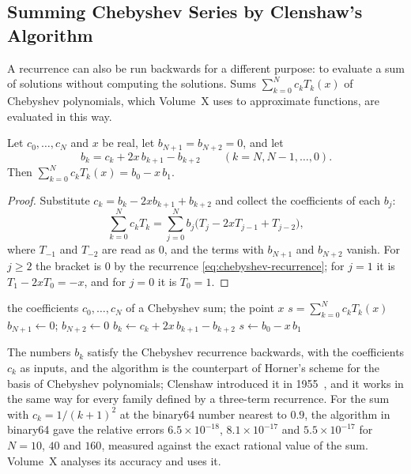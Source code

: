 \subsection{Summing Chebyshev Series by Clenshaw's Algorithm}

A recurrence can also be run backwards for a different purpose: to evaluate a sum of solutions without computing the solutions. Sums $\sum_{k=0}^Nc_kT_k(x)$ of Chebyshev polynomials, which Volume~X uses to approximate functions, are evaluated in this way.

\begin{proposition}
\label{prop:clenshaw}
Let $c_0,\ldots,c_N$ and $x$ be real, let $b_{N+1}=b_{N+2}=0$, and let
\[
b_k=c_k+2x\,b_{k+1}-b_{k+2}\qquad(k=N,N-1,\ldots,0).
\]
Then $\sum_{k=0}^Nc_kT_k(x)=b_0-x\,b_1$.
\end{proposition}

\begin{proof}
Substitute $c_k=b_k-2xb_{k+1}+b_{k+2}$ and collect the coefficients of each $b_j$:
\[
\sum_{k=0}^Nc_kT_k=\sum_{j=0}^{N}b_j\bigl(T_j-2xT_{j-1}+T_{j-2}\bigr),
\]
where $T_{-1}$ and $T_{-2}$ are read as $0$, and the terms with $b_{N+1}$ and $b_{N+2}$ vanish. For $j\ge2$ the bracket is $0$ by the recurrence \eqref{eq:chebyshev-recurrence}; for $j=1$ it is $T_1-2xT_0=-x$, and for $j=0$ it is $T_0=1$.
\end{proof}

\begin{algorithm}
\begin{algorithmic}[1]
\Require the coefficients $c_0,\ldots,c_N$ of a Chebyshev sum; the point $x$
\Ensure $s=\sum_{k=0}^Nc_kT_k(x)$
\State $b_{N+1}\gets0$; $b_{N+2}\gets0$
  \State $b_k\gets c_k+2x\,b_{k+1}-b_{k+2}$ 
\EndFor
\State \Return $s\gets b_0-x\,b_1$
\end{algorithmic}
\caption{Clenshaw's algorithm for a sum of Chebyshev polynomials (\cref{prop:clenshaw}). Each coefficient costs one multiplication by the precomputed $2x$ and two additions, and the values $T_k(x)$ are never formed.\label{alg:clenshaw}}
\end{algorithm}

The numbers $b_k$ satisfy the Chebyshev recurrence backwards, with the coefficients $c_k$ as inputs, and the algorithm is the counterpart of Horner's scheme for the basis of Chebyshev polynomials; Clenshaw introduced it in 1955~\cite{clenshaw1955}, and it works in the same way for every family defined by a three-term recurrence. For the sum with $c_k=1/(k+1)^2$ at the binary64 number nearest to $0.9$, the algorithm in binary64 gave the relative errors $6.5\times10^{-18}$, $8.1\times10^{-17}$ and $5.5\times10^{-17}$ for $N=10$, $40$ and $160$, measured against the exact rational value of the sum. Volume~X analyses its accuracy and uses it.

